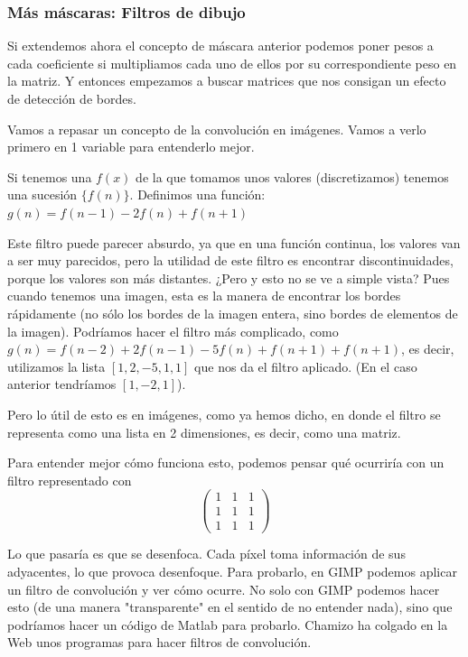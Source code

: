 	\subsubsection{Más máscaras: Filtros de dibujo}

		Si extendemos ahora el concepto de máscara anterior podemos poner pesos a cada coeficiente si multipliamos cada uno de ellos por su correspondiente peso en la matriz. Y entonces empezamos a buscar matrices que nos consigan un efecto de detección de bordes.

		Vamos a repasar un concepto de la convolución en imágenes. Vamos a verlo primero en 1 variable para entenderlo mejor.

		Si tenemos una $f(x)$ de la que tomamos unos valores (discretizamos) tenemos una sucesión $\{f(n)\}$. Definimos una función: $g(n) = f(n-1) - 2 f(n) + f(n+1)$

		Este filtro  puede parecer absurdo, ya que en una función continua, los valores van a ser muy parecidos, pero la utilidad de este filtro es encontrar discontinuidades, porque los valores son más distantes. ¿Pero y esto no se ve a simple vista? Pues cuando tenemos una imagen, esta es la manera de encontrar los bordes rápidamente (no sólo los bordes de la imagen entera, sino bordes de elementos de la imagen).
		Podríamos hacer el filtro más complicado, como $g(n) = f(n-2)+ 2f(n-1) - 5 f(n) + f(n+1) + f(n+1)$, es decir, utilizamos la lista $[1,2,-5,1,1]$ que nos da el filtro aplicado. (En el caso anterior tendríamos $[1,-2,1]$).

		Pero lo útil de esto es en imágenes, como ya hemos dicho, en donde el filtro se representa como una lista en 2 dimensiones, es decir, como una matriz.

		Para entender mejor cómo funciona esto, podemos pensar qué ocurriría con un filtro representado con \[ \begin{pmatrix} 1&1&1\\1&1&1\\1&1&1 \end{pmatrix} \]

		Lo que pasaría es que se desenfoca. Cada píxel toma información de sus adyacentes, lo que provoca desenfoque. Para probarlo, en GIMP  podemos aplicar un filtro de convolución y ver cómo ocurre. No solo con GIMP podemos hacer esto (de una manera "transparente" en el sentido de no entender nada), sino que podríamos hacer un código de Matlab para probarlo. Chamizo ha colgado en la Web unos programas para hacer filtros de convolución.

